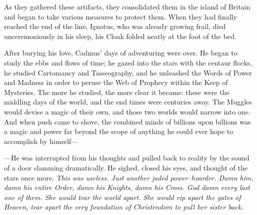 As they gathered these artifacts, they consolidated them in the island of Britain and began to take various measures to protect them. When they had finally reached the end of the line, Ignotus, who was already growing frail, died unceremoniously in his sleep, his Cloak folded neatly at the foot of the bed.

After burying his love, Cadmus’ days of adventuring were over. He began to study the ebbs and flows of time; he gazed into the stars with the centaur flocks, he studied Cartomancy and Tasseography, and he unleashed the Words of Power and Madness in order to peruse the Web of Prophecy within the Keep of Mysteries. The more he studied, the more clear it became: these were the middling days of the world, and the end times were centuries away. The Muggles would devise a magic of their own, and those two worlds would narrow into one. And when push came to shove, the combined minds of billions upon billions was a magic and power far beyond the scope of anything he could ever hope to accomplish by himself\mbox{---}

\mbox{---}He was interrupted from his thoughts and pulled back to reality by the sound of a door slamming dramatically. He sighed, closed his eyes, and thought of the stars once more.
\simpleline
\emph{This was useless. Just another jaded power\mbox{--}hoarder. Damn him, damn his entire Order, damn his Knights, damn his Cross. God damn every last one of them. She would tear the world apart. She would rip apart the gates of Heaven, tear apart the very foundation of Christendom to pull her sister back.}


